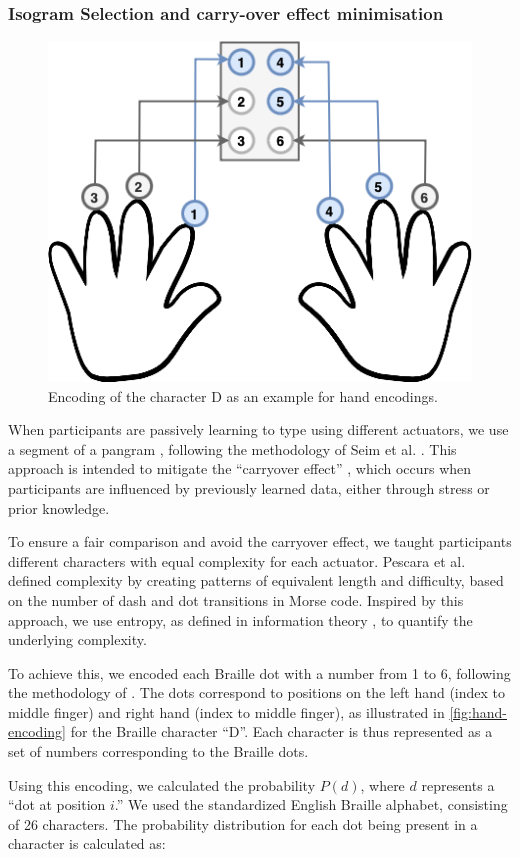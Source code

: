 \subsubsection{Isogram Selection and carry-over effect minimisation}
\begin{figure}
    \centering
    \includegraphics[width=0.5\linewidth]{src/pictures/handBrailleEncoding.drawio.png}
    \caption{Encoding of the character D as an example for hand encodings.}
    \label{fig:hand-encoding}
\end{figure}

When participants are passively learning to type using different actuators, we use a segment of a pangram \cite{Brooke1987}, following the methodology of Seim et al. \cite{Seim2018, Seim2016}. This approach is intended to mitigate the \enquote{carryover effect} \cite{MacFie1989, Brooks2012}, which occurs when participants are influenced by previously learned data, either through stress or prior knowledge.

To ensure a fair comparison and avoid the carryover effect, we taught participants different characters with equal complexity for each actuator. Pescara et al. \cite{Pescara2019} defined complexity by creating patterns of equivalent length and difficulty, based on the number of dash and dot transitions in Morse code. Inspired by this approach, we use entropy, as defined in information theory \cite{Gray2011, Shannon1948, Shannon2001}, to quantify the underlying complexity.

To achieve this, we encoded each Braille dot with a number from 1 to 6, following the methodology of \cite{Yang2017}. The dots correspond to positions on the left hand (index to middle finger) and right hand (index to middle finger), as illustrated in \autoref{fig:hand-encoding} for the Braille character \enquote{D}. Each character is thus represented as a set of numbers corresponding to the Braille dots.

Using this encoding, we calculated the probability \( P(d) \), where \( d \) represents a ``dot at position \( i \).'' We used the standardized English Braille alphabet, consisting of 26 characters. The probability distribution for each dot being present in a character is calculated as:

